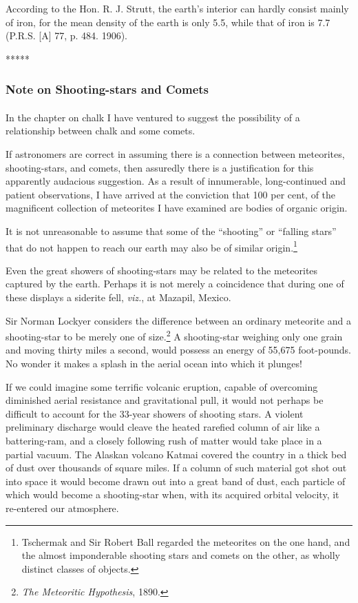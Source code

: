 \documentclass[a4paper, 12pt, oneside]{article}
\begin{document}
According to the Hon. R. J. Strutt, the earth's interior can hardly consist mainly of iron, for the mean density of the earth is only 5.5, while that of iron is 7.7 (P.R.S. [A] 77, p. 484. 1906).

\centerline{*\hspace{15mm}*\hspace{15mm}*\hspace{15mm}*\hspace{15mm}*}
\bigskip

\subsubsection{Note on Shooting-stars and Comets}
\paragraph{}
In the chapter on chalk I have ventured to suggest the possibility of a relationship between chalk and some comets.

If astronomers are correct in assuming there is a connection between meteorites, shooting-stars, and comets, then assuredly there is a justification for this apparently audacious suggestion. As a result of innumerable, long-continued and patient observations, I have arrived at the conviction that 100 per cent, of the magnificent collection of meteorites I have examined are bodies of organic origin.

It is not unreasonable to assume that some of the ``shooting'' or ``falling stars'' that do not happen to reach our earth may also be of similar origin.\footnote{Tschermak and Sir Robert Ball regarded the meteorites on the one hand, and the almost imponderable shooting stars and comets on the other, as wholly distinct classes of objects.}

Even the great showers of shooting-stars may be related to the meteorites captured by the earth. Perhaps it is not merely a coincidence that during one of these displays a siderite fell, \emph{viz.}, at Mazapil, Mexico.

Sir Norman Lockyer considers the difference between an ordinary meteorite and a shooting-star to be merely one of size.\footnote{\emph{The Meteoritic Hypothesis}, 1890.} A shooting-star weighing only one grain and moving thirty miles a second, would possess an energy of 55,675 foot-pounds. No wonder it makes a splash in the aerial ocean into which it plunges!

If we could imagine some terrific volcanic eruption, capable of overcoming diminished aerial resistance and gravitational pull, it would not perhaps be difficult to account for the 33-year showers of shooting stars. A violent preliminary discharge would cleave the heated rarefied column of air like a battering-ram, and a closely following rush of matter would take place in a partial vacuum. The Alaskan volcano Katmai covered the country in a thick bed of dust over thousands of square miles. If a column of such material got shot out into space it would become drawn out into a great band of dust, each particle of which would become a shooting-star when, with its acquired orbital velocity, it re-entered our atmosphere.
\end{document}

